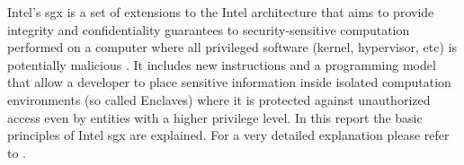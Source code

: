 Intel’s \ac{sgx} is a set of extensions to the Intel architecture that aims to provide integrity and confidentiality guarantees to security-sensitive
computation performed on a computer where all privileged software (kernel, hypervisor, etc) is potentially malicious \cite{Costan2016IntelSE}. It includes new instructions
and a programming model that allow a developer to place sensitive information inside isolated computation environments (so called Enclaves) where it is protected against
unauthorized access even by entities with a higher privilege level. In this report the basic principles of Intel \ac{sgx} are explained. For a very detailed explanation please refer
to \cite{Costan2016IntelSE}.

